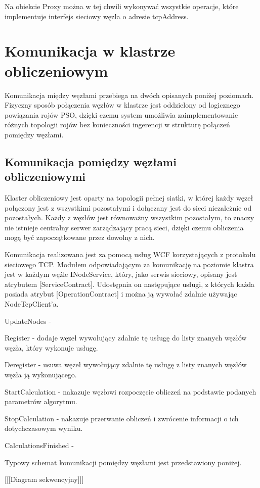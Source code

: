 \documentclass[12pt, twoside, openany, abstract=on]{report}
\theoremstyle{definition}
\begin{document}
Na obiekcie Proxy można w tej chwili wykonywać wszystkie operacje, które implementuje interfejs sieciowy węzła o adresie tcpAddress.

\section{Komunikacja w klastrze obliczeniowym}
Komunikacja między węzłami przebiega na dwóch opisanych poniżej poziomach. Fizyczny sposób połączenia węzłów w klastrze jest oddzielony od logicznego powiązania rojów PSO, dzięki czemu system umożliwia zaimplementowanie różnych topologii rojów bez konieczności ingerencji w strukturę połączeń pomiędzy węzłami.

\subsection{Komunikacja pomiędzy węzłami obliczeniowymi}
Klaster obliczeniowy jest oparty na topologii pełnej siatki, w której każdy węzeł połączony jest z wszystkimi pozostałymi i dołączany jest do sieci niezależnie od pozostałych. Każdy z węzłów jest równoważny wszystkim pozostałym, to znaczy nie istnieje centralny serwer zarządzający pracą sieci, dzięki czemu obliczenia mogą być zapoczątkowane przez dowolny z nich.

Komunikacja realizowana jest za pomocą usług WCF korzystających z protokołu sieciowego TCP. Modułem odpowiadającym za komunikację na poziomie klastra jest w każdym węźle INodeService, który, jako serwis sieciowy, opisany jest atrybutem [ServiceContract]. Udostępnia on następujące usługi, z których każda posiada atrybut [OperationContract] i można ją wywołać zdalnie używając NodeTcpClient'a.

UpdateNodes - 

Register - dodaje węzeł wywołujący zdalnie tę usługę do listy znanych węzłów węzła, który wykonuje usługę.

Deregister - usuwa węzeł wywołujący zdalnie tę usługę z listy znanych węzłów węzła ją wykonującego.

StartCalculation - nakazuje węzłowi rozpoczęcie obliczeń na podstawie podanych parametrów algorytmu.

StopCalculation - nakazuje przerwanie obliczeń i zwrócenie informacji o ich dotychczasowym wyniku.

CalculationsFinished - 

Typowy schemat komunikacji pomiędzy węzłami jest przedstawiony poniżej.

[[[Diagram sekwencyjny]]]
\end{document}
